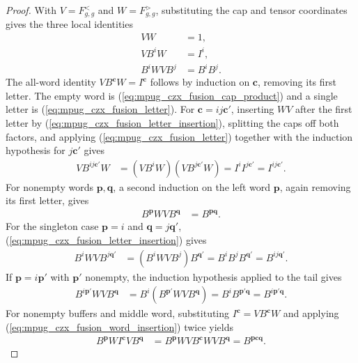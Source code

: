 \begin{proof}\leanok
    With $V=F^<_{g,g}$ and $W=F^>_{g,g}$, substituting the cap and
    tensor coordinates gives the three local identities
    \begin{align}
        VW       & =1,
        \label{eq:mpug_czx_fusion_cap_product} \\
        VB^iW    & =I^i,
        \label{eq:mpug_czx_fusion_letter}      \\
        B^iWVB^j & =B^iB^j.
        \label{eq:mpug_czx_fusion_letter_insertion}
    \end{align}
    The all-word identity $VB^{\mathbf c}W=I^{\mathbf c}$ follows by
    induction on $\mathbf c$, removing its first letter. The empty word
    is (\ref{eq:mpug_czx_fusion_cap_product}) and a single letter is
    (\ref{eq:mpug_czx_fusion_letter}). For $\mathbf c=ij\mathbf c'$,
    inserting $WV$ after the first letter by
    (\ref{eq:mpug_czx_fusion_letter_insertion}), splitting the caps off both
    factors, and applying (\ref{eq:mpug_czx_fusion_letter}) together with
    the induction hypothesis for $j\mathbf c'$ gives
    \begin{align}
        VB^{ij\mathbf c'}W
         & =(VB^iW)(VB^{j\mathbf c'}W)
        =I^iI^{j\mathbf c'}=I^{ij\mathbf c'}.
    \end{align}
    For nonempty words $\mathbf p,\mathbf q$, a second induction on the left
    word $\mathbf p$, again removing its first letter, gives
    \begin{align}
        B^{\mathbf p}WVB^{\mathbf q} & =B^{\mathbf p\mathbf q}.
        \label{eq:mpug_czx_fusion_word_insertion}
    \end{align}
    For the singleton case $\mathbf p=i$ and
    $\mathbf q=j\mathbf q'$,
    (\ref{eq:mpug_czx_fusion_letter_insertion}) gives
    \begin{align}
        B^iWVB^{j\mathbf q'}
         & =(B^iWVB^j)B^{\mathbf q'}
        =B^iB^jB^{\mathbf q'}=B^{i j\mathbf q'}.
    \end{align}
    If $\mathbf p=i\mathbf p'$ with $\mathbf p'$ nonempty, the induction
    hypothesis applied to the tail gives
    \begin{align}
        B^{i\mathbf p'}WVB^{\mathbf q}
         & =B^i(B^{\mathbf p'}WVB^{\mathbf q})
        =B^iB^{\mathbf p'\mathbf q}=B^{i\mathbf p'\mathbf q}.
    \end{align}
    For nonempty buffers and middle word, substituting
    $I^{\mathbf c}=VB^{\mathbf c}W$ and applying
    (\ref{eq:mpug_czx_fusion_word_insertion}) twice yields
    \begin{align}
        B^{\mathbf p}WI^{\mathbf c}VB^{\mathbf q}
         & =B^{\mathbf p}WVB^{\mathbf c}WVB^{\mathbf q}
        =B^{\mathbf p\mathbf c\mathbf q}.
    \end{align}
\end{proof}

